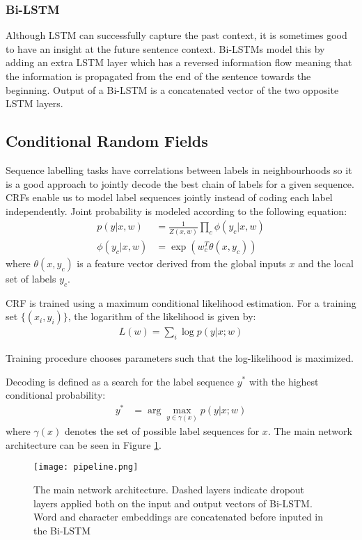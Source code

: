 \subsubsection{Bi-LSTM}
Although LSTM can successfully capture the past context, it is sometimes good
to have an insight at the future sentence context. Bi-LSTMs model
this by adding an extra LSTM layer which has a reversed information flow
meaning that the information is propagated from the end of the sentence towards
the beginning. Output of a Bi-LSTM is a concatenated vector of the two opposite
LSTM layers.

\subsection{Conditional Random Fields}
Sequence labelling tasks have correlations between labels in neighbourhoods so
it is a good approach to jointly decode the best chain of labels for a given
sequence. CRFs enable us to model label sequences jointly instead of coding
each label independently. Joint probability is modeled according to the following
equation:
\begin{align*}
    p(y | x, w) &= \frac{1}{Z(x, w)} \prod_c \phi(y_c | x, w)\\
    \phi(y_c | x, w) &= \exp(w_c^T \theta(x, y_c))
\end{align*}
where $\theta(x, y_c)$ is a feature vector derived from the global inputs $x$
and the local set of labels $y_c$.

CRF is trained using a maximum conditional likelihood estimation. For a
training set $\{(x_i, y_i)\}$, the logarithm of the likelihood is given by:
\begin{align*}
    L(w) = \sum_i \log p(y | x; w)
\end{align*}

Training procedure chooses parameters such that the log-likelihood is
maximized.

Decoding is defined as a search for the label sequence $y^*$ with the highest
conditional probability:
\begin{align*}
    y^* &= \arg\max\limits_{y \in \gamma(x)} p(y | x; w)
\end{align*}
where $\gamma(x)$ denotes the set of possible label sequences for $x$.
The main network architecture can be seen in Figure \ref{fig:pipeline}.

\begin{figure}
  \caption{The main network architecture. Dashed layers indicate dropout layers
  applied both on the input and output vectors of Bi-LSTM. Word and character
  embeddings are concatenated before inputed in the Bi-LSTM}
  \label{fig:pipeline}
  \centering
    \texttt{[image: pipeline.png]}
\end{figure}

